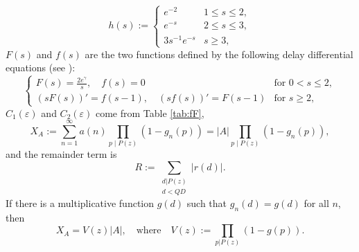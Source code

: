 \documentclass[12pt]{amsart}
\begin{document}
\begin{theorem}
\begin{equation}
h(s):= \begin{cases} 
      e^{-2} & 1\le s \le 2, \\
      e^{-s} & 2\le s \le 3, \\
      3s^{-1}e^{-s} & s\ge 3,
      \end{cases} 
\end{equation}
$F(s)$ and $f(s)$ are the two functions defined by the following delay differential equations (see \cite{Cai1}):
\begin{equation} \label{def-f(s)-F(s)}
    \begin{cases}
        F(s) = \frac{2 e^{\gamma}}{s}, \quad f(s) = 0 &\text{for } 0 < s \le 2,\\
        (sF(s))' = f(s - 1), \quad (sf(s))' = F(s-1) &\text{for } s \ge 2,
    \end{cases}
\end{equation}
$C_1(\varepsilon)$ and $C_2(\varepsilon)$ come from Table \ref{tab:fF},
\begin{equation} \label{eq: def-X_A}
    X_A:=\sum_{n=1}^{\infty} a(n) \prod_{p\mid P(z)}(1-g_n(p))=|A|\prod_{p\mid P(z)}(1-g_n(p)),
\end{equation}
and the remainder term is
\begin{equation}\label{Rdef}
    R:=\sum_{\substack{d|P(z)\\ d<QD}}|r(d)|.
\end{equation}
If there is a multiplicative function $g(d)$ such that $g_n(d)=g(d)$ for all $n$, then
\begin{equation}\label{vzdef}
X_A=V(z)|A|, \quad \text{where} \quad 
V(z):=\prod_{p|P(z)}(1-g(p)).
\end{equation}
\end{theorem}
\end{document}
